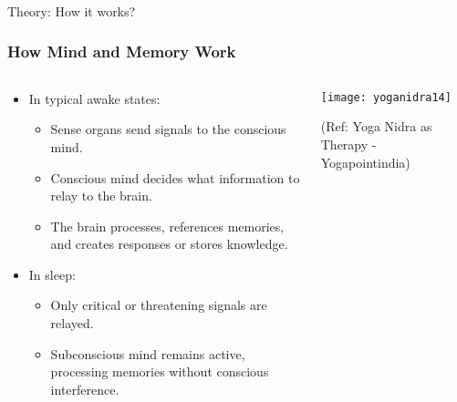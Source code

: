 \begin{frame}[fragile]\frametitle{}
\begin{center}
{\Large Theory: How it works?}
\end{center}
\end{frame}


\begin{frame}[fragile]\frametitle{How Mind and Memory Work}
    \begin{columns}
        \begin{column}{0.48\textwidth}
			\begin{itemize}
				\item In typical awake states:
					\begin{itemize}
						\item Sense organs send signals to the conscious mind.
						\item Conscious mind decides what information to relay to the brain.
						\item The brain processes, references memories, and creates responses or stores knowledge.
					\end{itemize}
				\item In sleep:
					\begin{itemize}
						\item Only critical or threatening signals are relayed.
						\item Subconscious mind remains active, processing memories without conscious interference.
					\end{itemize}
			\end{itemize}
        \end{column}
        \begin{column}{0.48\textwidth}	
			  \begin{center}
				\texttt{[image: yoganidra14]}

				{\tiny (Ref: Yoga Nidra as Therapy - Yogapointindia)}		
				\end{center}	
        \end{column}
    \end{columns}				
\end{frame}


